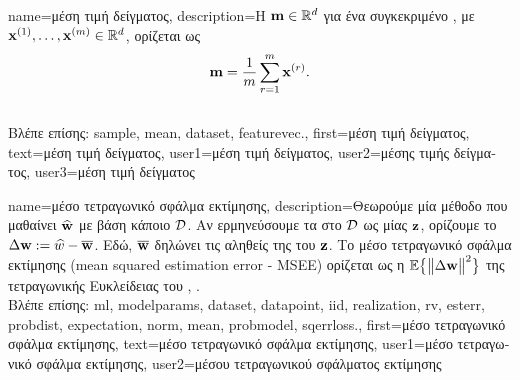 {name={\foreignlanguage{greek}{μέση τιμή δείγματος}}, 
	description={\foreignlanguage{greek}{Η} 
		  ${\bf m} \in \mathbb{R}^{d}$ \foreignlanguage{greek}{για ένα συγκεκριμένο} 
		, \foreignlanguage{greek}{με} 
		 ${\bf x}^{(1)}, \ldots, {\bf x}^{(m)} \in \mathbb{R}^{d}$, 
		\foreignlanguage{greek}{ορίζεται ως}  
		$${\bf m} = \frac{1}{m} \sum_{r=1}^{m} {\bf x}^{(r)}.$$\\
		\foreignlanguage{greek}{Βλέπε επίσης:} \gls{sample}, \gls{mean}, \gls{dataset}, \gls{featurevec}.},
	first={\foreignlanguage{greek}{μέση τιμή δείγματος}},
	text={\foreignlanguage{greek}{μέση τιμή δείγματος}},
	user1={\foreignlanguage{greek}{μέση τιμή δείγματος}}, %
	user2={\foreignlanguage{greek}{μέσης τιμής δείγματος}}, %
	user3={\foreignlanguage{greek}{μέση τιμή δείγματος}} %
}

{name={\foreignlanguage{greek}{μέσο τετραγωνικό σφάλμα εκτίμησης}},
	description={\foreignlanguage{greek}{Θεωρούμε μία μέθοδο} 
		 \foreignlanguage{greek}{που μαθαίνει}  $\widehat{{\bf w}}$ 
		\foreignlanguage{greek}{με βάση κάποιο}  $\mathcal{D}$. 
		\foreignlanguage{greek}{Αν ερμηνεύσουμε τα}  \foreignlanguage{greek}{στο} $\mathcal{D}$ 
		\foreignlanguage{greek}{ως}   \foreignlanguage{greek}{μίας}  ${\bf z}$, 
		\foreignlanguage{greek}{ορίζουμε το}  $\Delta {\bf w} := \widehat{w} - \overline{{\bf w}}$. 
		\foreignlanguage{greek}{Εδώ, $\overline{{\bf w}}$ δηλώνει τις αληθείς}  \foreignlanguage{greek}{της} 
		 \foreignlanguage{greek}{του ${\bf z}$. Το μέσο τετραγωνικό σφάλμα εκτίμησης} 
		(mean squared estimation error - MSEE) \foreignlanguage{greek}{ορίζεται ως η}  
		$\mathbb{E} \big\{ \big\| \Delta {\bf w} \big\|^{2} \big\}$ \foreignlanguage{greek}{της τετραγωνικής Ευκλεί\-δειας}
		 \foreignlanguage{greek}{του}  \cite{LC}, \cite{kay}.\\
		\foreignlanguage{greek}{Βλέπε επίσης:} \gls{ml}, \gls{modelparams}, \gls{dataset}, \gls{datapoint}, \gls{iid}, \gls{realization}, \gls{rv}, 
		\gls{esterr}, \gls{probdist}, \gls{expectation}, \gls{norm},  \gls{mean}, \gls{probmodel}, \gls{sqerrloss}.},
	first={\foreignlanguage{greek}{μέσο τετραγωνικό σφάλμα εκτίμησης}},
	text={\foreignlanguage{greek}{μέσο τετραγωνικό σφάλμα εκτίμησης}},
	user1={\foreignlanguage{greek}{μέσο τετραγωνικό σφάλμα εκτίμησης}}, %
    	user2={\foreignlanguage{greek}{μέσου τετραγωνικού σφάλματος εκτίμησης}} %
}

